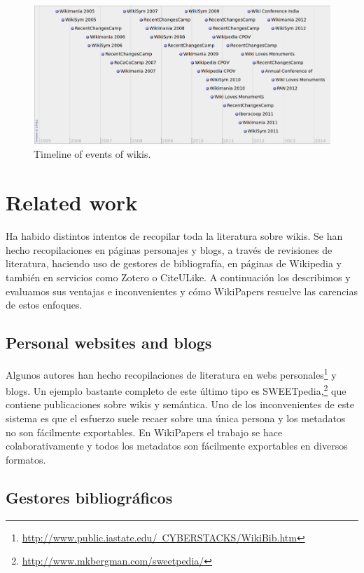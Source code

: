 \documentclass[11pt,twocolumn]{article}
\begin{document}
\begin{figure}[htb]
    \centering
    \includegraphics[width=\textwidth]{wptimeline.png} %
    \caption{Timeline of events of wikis.}
    \label{fig:wptimeline}
\end{figure}


\section{Related work}
Ha habido distintos intentos de recopilar toda la literatura sobre wikis. Se han hecho recopilaciones en páginas personajes y blogs, a través de revisiones de literatura, haciendo uso de gestores de bibliografía, en páginas de Wikipedia y también en servicios como Zotero o CiteULike. A continuación los describimos y evaluamos sus ventajas e inconvenientes y cómo WikiPapers resuelve las carencias de estos enfoques.

\subsection{Personal websites and blogs}
Algunos autores han hecho recopilaciones de literatura en webs personales\footnote{\href{http://www.public.iastate.edu/~CYBERSTACKS/WikiBib.htm}{http://www.public.iastate.edu/~CYBERSTACKS/WikiBib.htm}} y blogs. Un ejemplo bastante completo de este último tipo es SWEETpedia,\footnote{\href{http://www.mkbergman.com/sweetpedia/}{http://www.mkbergman.com/sweetpedia/}} que contiene publicaciones sobre wikis y semántica. Uno de los inconvenientes de este sistema es que el esfuerzo suele recaer sobre una única persona y los metadatos no son fácilmente exportables. En WikiPapers el trabajo se hace colaborativamente y todos los metadatos son fácilmente exportables en diversos formatos.

\subsection{Gestores bibliográficos}
\end{document}
